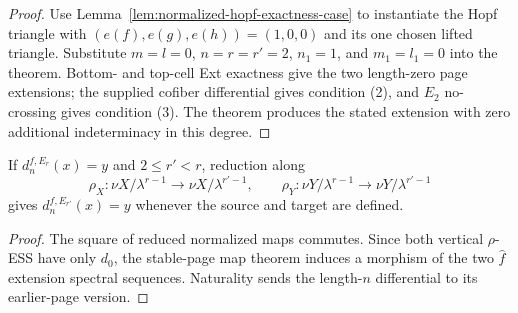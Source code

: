 \begin{proof}
  Use Lemma~\ref{lem:normalized-hopf-exactness-case} to instantiate the Hopf
  triangle with $(e(f),e(g),e(h))=(1,0,0)$ and its one chosen lifted triangle.
  Substitute $m=l=0$, $n=r=r'=2$, $n_1=1$, and $m_1=l_1=0$ into the theorem.
  Bottom- and top-cell Ext exactness give the two length-zero page extensions;
  the supplied cofiber differential gives condition (2), and $E_2$
  no-crossing gives condition (3).  The theorem produces the stated
  extension with zero additional indeterminacy in this degree.
\end{proof}

\begin{proposition}
  \label{prop:page-extension-restrict}
  \notready
  If $d_n^{f,E_r}(x)=y$ and $2\le r'<r$, reduction along
  \[
    \rho_X:\nu X/\lambda^{r-1}\to\nu X/\lambda^{r'-1},
    \qquad
    \rho_Y:\nu Y/\lambda^{r-1}\to\nu Y/\lambda^{r'-1}
  \]
  gives
  $d_n^{f,E_{r'}}(x)=y$ whenever the source and target are defined.
\end{proposition}

\begin{proof}
  The square of reduced normalized maps commutes.  Since both vertical
  $\rho$-ESS have only $d_0$, the stable-page map theorem induces a morphism of
  the two $\widehat f$ extension spectral sequences.  Naturality sends the
  length-$n$ differential to its earlier-page version.
\end{proof}

